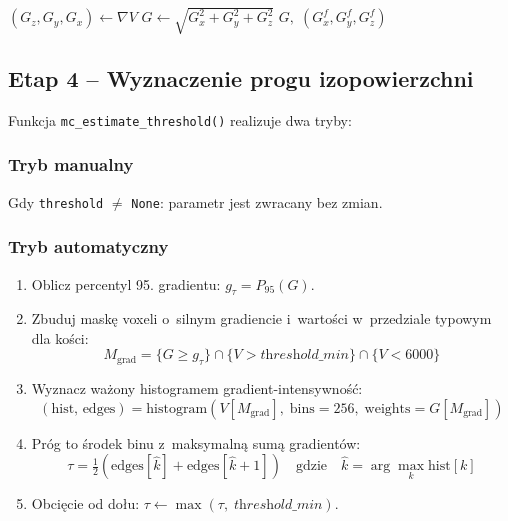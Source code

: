 \documentclass[12pt,a4paper]{article}
\begin{document}
\begin{algorithm}[H]
\caption{\textsc{Gradient} -- magntiuda gradientu i gradienty kierunkowe}
\label{alg:grad}
\BlankLine
$(G_z, G_y, G_x) \leftarrow \nabla V$ 
$G \leftarrow \sqrt{G_x^2 + G_y^2 + G_z^2}$\;
\Return $G,\; (G_x^f, G_y^f, G_z^f)$\;
\end{algorithm}

\subsection{Etap 4 -- Wyznaczenie progu izopowierzchni}
\label{sec:threshold}

Funkcja \texttt{mc\_estimate\_threshold()} realizuje dwa tryby:

\subsubsection*{Tryb manualny}
Gdy \texttt{threshold} $\neq$ \texttt{None}: parametr jest zwracany bez zmian.

\subsubsection*{Tryb automatyczny}
\begin{enumerate}
  \item Oblicz percentyl 95. gradientu: $g_{\tau} = P_{95}(G)$.
  \item Zbuduj maskę voxeli o~silnym gradiencie i~wartości w~przedziale
    typowym dla kości:
    \[
      M_{\text{grad}} = \{G \geq g_{\tau}\} \cap
        \{V > \textit{threshold\_min}\} \cap \{V < 6000\}
    \]
  \item Wyznacz ważony histogramem gradient-intensywność:
    \[
      (\text{hist},\, \text{edges}) = \mathrm{histogram}(V[M_{\text{grad}}],\;
        \text{bins}=256,\; \text{weights}=G[M_{\text{grad}}])
    \]
  \item Próg to środek binu z~maksymalną sumą gradientów:
    \[
      \tau = \tfrac{1}{2}(\text{edges}[\hat{k}] + \text{edges}[\hat{k}+1])
      \quad \text{gdzie} \quad
      \hat{k} = \arg\max_k \text{hist}[k]
    \]
  \item Obcięcie od dołu: $\tau \leftarrow \max(\tau,\; \textit{threshold\_min})$.
\end{enumerate}
\end{document}
